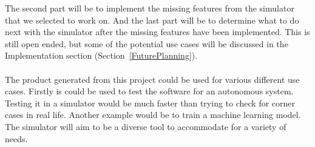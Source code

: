 The second part will be to implement the missing features from the simulator that we selected to work on.
And the last part will be to determine what to do next with the simulator after the missing features have been implemented. This is still open ended, but some of the potential use cases will be discussed in the Implementation section (Section~\ref{FuturePlanning}).
\\~\\ 
The product generated from this project could be used for various different use cases. Firstly is could be used to test the software for an autonomous system. Testing it in a simulator would be much faster than trying to check for corner cases in real life. Another example would be to train a machine learning model. The simulator will aim to be a diverse tool to accommodate for a variety of needs. 